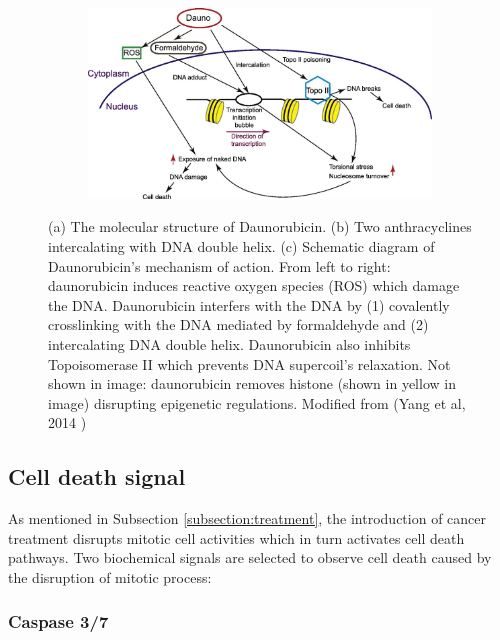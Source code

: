 \documentclass[pdftex,12pt,a4paper]{report}
\begin{document}
\begin{figure}[H]
\begin{subfigure}{.4\textwidth}
  \caption{}
  \label{fig:anthracyclines_dna}
\end{subfigure}
\centering
\begin{subfigure}{\textwidth}
  \centering
  \includegraphics[width=\textwidth]{images/daunorubicin_mechanism}
  \caption{}
  \label{fig:dauno_mechanism}
\end{subfigure}
\caption[The structure and mechanism of Daunorubicin]{(a) The molecular structure of Daunorubicin. (b) Two anthracyclines intercalating with DNA double helix. (c) Schematic diagram of Daunorubicin's mechanism of action. From left to right: daunorubicin induces reactive oxygen species (ROS) which damage the DNA. Daunorubicin interfers with the DNA by (1) covalently crosslinking with the DNA mediated by formaldehyde and (2) intercalating DNA double helix. Daunorubicin also inhibits Topoisomerase II which prevents DNA supercoil's relaxation. Not shown in image: daunorubicin removes histone (shown in yellow in image) disrupting epigenetic regulations. Modified from (Yang et al, 2014 \cite{yang2014doxorubicin})}
\end{figure}

\subsection{Cell death signal}
\label{subsection:cell_death_signal}

As mentioned in Subsection \ref{subsection:treatment}, the introduction of cancer treatment disrupts mitotic cell activities which in turn activates cell death pathways. Two biochemical signals are selected to observe cell death caused by the disruption of mitotic process: %

\subsubsection*{Caspase 3/7}
\end{document}

